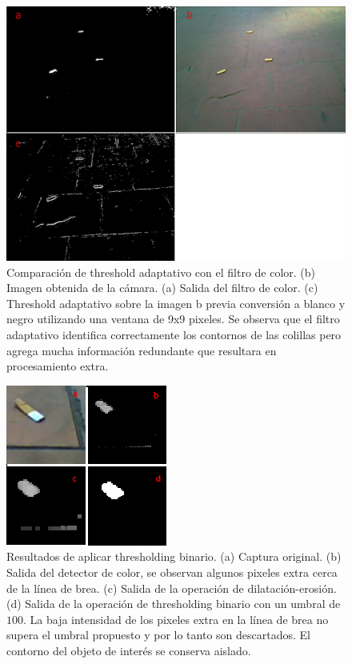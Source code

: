 \begin{figure}[tpb]
\begin{center}
  \includegraphics[scale=0.25]{figuras/adaptative.png}
\end{center}
  \caption{\small Comparación de threshold adaptativo con el filtro de 
  color. (b) Imagen obtenida de la cámara. 
  (a) Salida del filtro de color. (c) Threshold adaptativo sobre la 
  imagen b previa conversión a blanco y negro utilizando una ventana 
  de 9x9 pixeles. Se observa que el filtro adaptativo identifica 
  correctamente los contornos de las colillas pero agrega mucha 
  información redundante que resultara en procesamiento extra.}
  \label{fig:thresh_adapt}
\end{figure}


\begin{figure}[tpb]
\begin{center}
  \includegraphics[scale=0.8]{figuras/threshold-ruido.png}
\end{center}
 \caption{\small Resultados de aplicar thresholding binario. (a) Captura original. (b) Salida del detector de color, se observan algunos pixeles extra cerca de la línea de brea. (c) Salida de la operación de dilatación-erosión. (d) Salida de la operación de thresholding binario con un umbral de $100$. La baja intensidad de los pixeles extra en la línea de brea no supera el umbral propuesto y por lo tanto son descartados. El contorno del objeto de interés se conserva aislado.} 
  \label{fig:threshold_ruido}
\end{figure}

